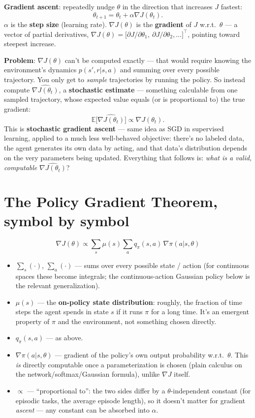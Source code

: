 \documentclass[11pt]{article}
\begin{document}
\textbf{Gradient ascent}: repeatedly nudge $\theta$ in the direction that increases $J$
fastest:
$$\theta_{t+1} = \theta_t + \alpha \nabla J(\theta_t).$$
$\alpha$ is the \textbf{step size} (learning rate). $\nabla J(\theta)$ is the
\textbf{gradient} of $J$ w.r.t.\ $\theta$ --- a vector of partial derivatives,
$\nabla J(\theta) = \big[\partial J/\partial\theta_1,\ \partial J/\partial\theta_2,\dots\big]^\top$,
pointing toward steepest increase.

\textbf{Problem}: $\nabla J(\theta)$ can't be computed exactly --- that would require
knowing the environment's dynamics $p(s',r|s,a)$ and summing over every possible
trajectory. You only get to \emph{sample} trajectories by running the policy. So instead
compute $\widehat{\nabla J(\theta_t)}$, a \textbf{stochastic estimate} --- something
calculable from one sampled trajectory, whose expected value equals (or is proportional
to) the true gradient:
$$\mathbb E\big[\widehat{\nabla J(\theta_t)}\big] \propto \nabla J(\theta_t).$$
This is \textbf{stochastic gradient ascent} --- same idea as SGD in supervised learning,
applied to a much less well-behaved objective: there's no labeled data, the agent
generates its own data by acting, and that data's distribution depends on the very
parameters being updated. Everything that follows is: \emph{what is a valid, computable}
$\widehat{\nabla J(\theta_t)}$?

\section*{The Policy Gradient Theorem, symbol by symbol}

$$\nabla J(\theta) \propto \sum_s \mu(s) \sum_a q_\pi(s,a)\,\nabla \pi(a|s,\theta)$$

\begin{itemize}
  \item $\sum_s(\cdot)$, $\sum_a(\cdot)$ --- sums over every possible state / action (for
  continuous spaces these become integrals; the continuous-action Gaussian policy below is
  the relevant generalization).
  \item $\mu(s)$ --- the \textbf{on-policy state distribution}: roughly, the fraction of
  time steps the agent spends in state $s$ if it runs $\pi$ for a long time. It's an
  emergent property of $\pi$ and the environment, not something chosen directly.
  \item $q_\pi(s,a)$ --- as above.
  \item $\nabla\pi(a|s,\theta)$ --- gradient of the policy's own output probability w.r.t.\
  $\theta$. This \emph{is} directly computable once a parameterization is chosen (plain
  calculus on the network/softmax/Gaussian formula), unlike $\nabla J$ itself.
  \item $\propto$ --- ``proportional to'': the two sides differ by a $\theta$-independent
  constant (for episodic tasks, the average episode length), so it doesn't matter for
  gradient \emph{ascent} --- any constant can be absorbed into $\alpha$.
\end{itemize}
\end{document}
